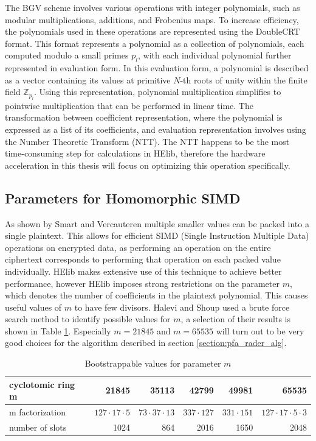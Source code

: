 \documentclass[english,master=eelt,masteroption=ec]{kulemt}
\begin{document}
The BGV scheme involves various operations with integer polynomials, such as modular multiplications, additions, and Frobenius maps. To increase efficiency, the polynomials used in these operations are represented using the DoubleCRT format. This format represents a polynomial as a collection of polynomials, each computed modulo a small primes $p_l$, with each individual polynomial further represented in evaluation form. In this evaluation form, a polynomial is described as a vector containing its values at primitive $N$-th roots of unity within the finite field $\mathbb{Z}_{p_l}$. Using this representation, polynomial multiplication simplifies to pointwise multiplication that can be performed in linear time. The transformation between coefficient representation, where the polynomial is expressed as a list of its coefficients, and evaluation representation involves using the Number Theoretic Transform (NTT). The NTT happens to be the most time-consuming step for calculations in HElib, therefore the hardware acceleration in this thesis will focus on optimizing this operation specifically.

\subsection{Parameters for Homomorphic SIMD}
As shown by Smart and Vercauteren\cite{FHEsimd} multiple smaller values can be packed into a single plaintext. This allows for efficient SIMD (Single Instruction Multiple Data) operations on encrypted data, as performing an operation on the entire ciphertext corresponds to performing that operation on each packed value individually. HElib makes extensive use of this technique to achieve better performance, however HElib imposes strong restrictions on the parameter $m$, which denotes the number of coefficients in the plaintext polynomial. This causes useful values of $m$ to have few divisors. Halevi and Shoup\cite{cryptoeprint:2014/873}  used a brute force search method to identify possible values for $m$, a selection of their results is shown in Table \ref{table:parameter_m}. Especially $m=21845$ and $m=65535$ will turn out to be very good choices for the algorithm described in section \ref{section:pfa_rader_alg}.

\begin{table}[h!]
\caption{Bootstrappable values for parameter $m$}
\label{table:parameter_m}
\centering
\begin{tabular}{|l|r|r|r|r|r|} 
\hline
cyclotomic ring m & 21845        & 35113        & 42799    & 49981   & 65535 \\ \hline \hline
m factorization   & $127\cdot17\cdot5$ & $73\cdot37\cdot13$ & $337\cdot127$ & $331\cdot151$ & $127\cdot17\cdot5\cdot3$ \\ \hline
number of slots   & 1024         & 864          & 2016     & 1650    & 2048 \\
 \hline
\end{tabular}
\end{table}
\end{document}
